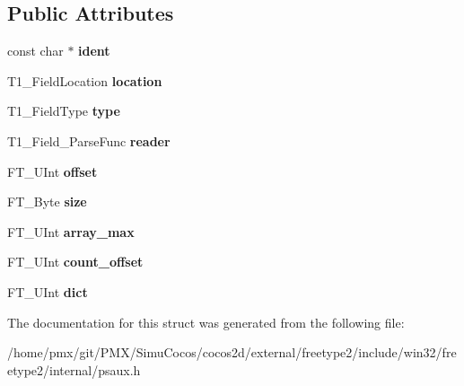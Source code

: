 \subsection*{Public Attributes}
\begin{DoxyCompactItemize}
\item 
\mbox{\label{structT1__FieldRec___a6f5ac1f22efd085f5a3c6c99eaf91429}} 
const char $\ast$ {\bfseries ident}
\item 
\mbox{\label{structT1__FieldRec___a1e17111c68df523f82d20bddd822ca4d}} 
T1\+\_\+\+Field\+Location {\bfseries location}
\item 
\mbox{\label{structT1__FieldRec___ad873155b36b72db9a1feaf2699fed1ce}} 
T1\+\_\+\+Field\+Type {\bfseries type}
\item 
\mbox{\label{structT1__FieldRec___a95e227de47c22bdadd77f797ff43d89d}} 
T1\+\_\+\+Field\+\_\+\+Parse\+Func {\bfseries reader}
\item 
\mbox{\label{structT1__FieldRec___a41b503016f68291e061a2e29498982c1}} 
F\+T\+\_\+\+U\+Int {\bfseries offset}
\item 
\mbox{\label{structT1__FieldRec___a8ce74a7ad2276abe8942883e7fbb1241}} 
F\+T\+\_\+\+Byte {\bfseries size}
\item 
\mbox{\label{structT1__FieldRec___a87f063bd3ad0dcfa30c00946d9f9cae8}} 
F\+T\+\_\+\+U\+Int {\bfseries array\+\_\+max}
\item 
\mbox{\label{structT1__FieldRec___a41d8814cc651d0276f8cfad751721326}} 
F\+T\+\_\+\+U\+Int {\bfseries count\+\_\+offset}
\item 
\mbox{\label{structT1__FieldRec___a509f7ddb1e0ffe050017daa29223e224}} 
F\+T\+\_\+\+U\+Int {\bfseries dict}
\end{DoxyCompactItemize}


The documentation for this struct was generated from the following file\+:\begin{DoxyCompactItemize}
\item 
/home/pmx/git/\+P\+M\+X/\+Simu\+Cocos/cocos2d/external/freetype2/include/win32/freetype2/internal/psaux.\+h\end{DoxyCompactItemize}
